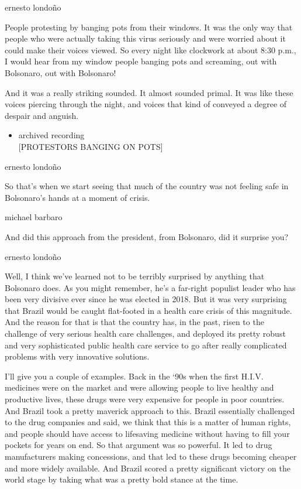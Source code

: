 ernesto londoño

People protesting by banging pots from their windows. It was the only
way that people who were actually taking this virus seriously and were
worried about it could make their voices viewed. So every night like
clockwork at about 8:30 p.m., I would hear from my window people banging
pots and screaming, out with Bolsonaro, out with Bolsonaro!

And it was a really striking sounded. It almost sounded primal. It was
like these voices piercing through the night, and voices that kind of
conveyed a degree of despair and anguish.

\begin{itemize}
\tightlist
\item
  archived recording\\
  {[}PROTESTORS BANGING ON POTS{]}
\end{itemize}

ernesto londoño

So that's when we start seeing that much of the country was not feeling
safe in Bolsonaro's hands at a moment of crisis.

michael barbaro

And did this approach from the president, from Bolsonaro, did it
surprise you?

ernesto londoño

Well, I think we've learned not to be terribly surprised by anything
that Bolsonaro does. As you might remember, he's a far-right populist
leader who has been very divisive ever since he was elected in 2018. But
it was very surprising that Brazil would be caught flat-footed in a
health care crisis of this magnitude. And the reason for that is that
the country has, in the past, risen to the challenge of very serious
health care challenges, and deployed its pretty robust and very
sophisticated public health care service to go after really complicated
problems with very innovative solutions.

I'll give you a couple of examples. Back in the `90s when the first
H.I.V. medicines were on the market and were allowing people to live
healthy and productive lives, these drugs were very expensive for people
in poor countries. And Brazil took a pretty maverick approach to this.
Brazil essentially challenged to the drug companies and said, we think
that this is a matter of human rights, and people should have access to
lifesaving medicine without having to fill your pockets for years on
end. So that argument was so powerful. It led to drug manufacturers
making concessions, and that led to these drugs becoming cheaper and
more widely available. And Brazil scored a pretty significant victory on
the world stage by taking what was a pretty bold stance at the time.

